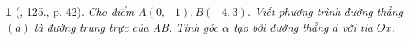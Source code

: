 \documentclass{article}
\newtheorem{baitoan}{}
\begin{document}
\begin{baitoan}[\cite{Tuyen_Toan_9_old}, 125., p. 42]
	Cho điểm $A(0,-1),B(-4,3)$. Viết phương trình đường thẳng $(d)$ là đường trung trực của AB. Tính góc $\alpha$ tạo bởi đường thẳng $d$ với tia $Ox$.
\end{baitoan}


\printbibliography[heading=bibintoc]
	
\end{document}
